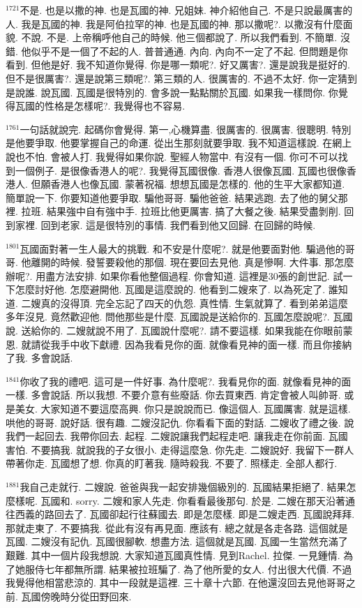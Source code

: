 \documentclass{book}
\begin{document}
$^{1721}$不是.
也是以撒的神.
也是瓦國的神.
兄姐妹.
神介紹他自己.
不是只說最厲害的人.
我是瓦國的神.
我是阿伯拉罕的神.
也是瓦國的神.
那以撒呢?.
以撒沒有什麼面貌.
不說.
不是.
上帝稱呼他自己的時候.
他三個都說了.
所以我們看到.
不簡單.
沒錯.
他似乎不是一個了不起的人.
普普通通.
內向.
內向不一定了不起.
但問題是你看到.
但他是好.
我不知道你覺得.
你是哪一類呢?.
好又厲害?.
還是說我是挺好的.
但不是很厲害?.
還是說第三類呢?.
第三類的人.
很厲害的.
不過不太好.
你一定猜到是說誰.
說瓦國.
瓦國是很特別的.
會多說一點點關於瓦國.
如果我一樣問你.
你覺得瓦國的性格是怎樣呢?.
我覺得也不容易.

$^{1761}$一句話就說完.
起碼你會覺得.
第一,心機算盡.
很厲害的.
很厲害.
很聰明.
特別是他要爭取.
他要掌握自己的命運.
從出生那刻就要爭取.
我不知道這樣說.
在網上說也不怕.
會被人打.
我覺得如果你說.
聖經人物當中.
有沒有一個.
你可不可以找到一個例子.
是很像香港人的呢?.
我覺得瓦國很像.
香港人很像瓦國.
瓦國也很像香港人.
但願香港人也像瓦國.
蒙著祝福.
想想瓦國是怎樣的.
他的生平大家都知道.
簡單說一下.
你要知道他要爭取.
騙他哥哥.
騙他爸爸.
結果逃跑.
去了他的舅父那裡.
拉班.
結果強中自有強中手.
拉班比他更厲害.
搞了大餐之後.
結果受盡剝削.
回到家裡.
回到老家.
這是很特別的事情.
我們看到他又回歸.
在回歸的時候.

$^{1801}$瓦國面對著一生人最大的挑戰.
和不安是什麼呢?.
就是他要面對他.
騙過他的哥哥.
他離開的時候.
發誓要殺他的那個.
現在要回去見他.
真是慘啊.
大件事.
那怎麼辦呢?.
用盡方法安排.
如果你看他整個過程.
你會知道.
這裡是30張的創世記.
試一下怎麼討好他.
怎麼避開他.
瓦國是這麼說的.
他看到二嫂來了.
以為死定了.
誰知道.
二嫂真的沒得頂.
完全忘記了四天的仇怨.
真性情.
生氣就算了.
看到弟弟這麼多年沒見.
竟然歡迎他.
問他那些是什麼.
瓦國說是送給你的.
瓦國怎麼說呢?.
瓦國說.
送給你的.
二嫂就說不用了.
瓦國說什麼呢?.
請不要這樣.
如果我能在你眼前蒙恩.
就請從我手中收下獻禮.
因為我看見你的面.
就像看見神的面一樣.
而且你接納了我.
多會說話.

$^{1841}$你收了我的禮吧.
這可是一件好事.
為什麼呢?.
我看見你的面.
就像看見神的面一樣.
多會說話.
所以我想.
不要介意有些廢話.
你去買東西.
肯定會被人叫帥哥.
或是美女.
大家知道不要這麼高興.
你只是說說而已.
像這個人.
瓦國厲害.
就是這樣.
哄他的哥哥.
說好話.
很有趣.
二嫂沒記仇.
你看看下面的對話.
二嫂收了禮之後.
說我們一起回去.
我帶你回去.
起程.
二嫂說讓我們起程走吧.
讓我走在你前面.
瓦國害怕.
不要搞我.
就說我的子女很小.
走得這麼急.
你先走.
二嫂說好.
我留下一群人帶著你走.
瓦國想了想.
你真的盯著我.
隨時殺我.
不要了.
照樣走.
全部人都行.

$^{1881}$我自己走就行.
二嫂說.
爸爸與我一起安排幾個級別的.
瓦國結果拒絕了.
結果怎麼樣呢.
瓦國和.
sorry.
二嫂和家人先走.
你看看最後那句.
於是.
二嫂在那天沿著通往西義的路回去了.
瓦國卻起行往蘇國去.
即是怎麼樣.
即是二嫂走西.
瓦國說拜拜.
那就走東了.
不要搞我.
從此有沒有再見面.
應該有.
總之就是各走各路.
這個就是瓦國.
二嫂沒有記仇.
瓦國很腳軟.
想盡方法.
這個就是瓦國.
瓦國一生當然充滿了艱難.
其中一個片段我想說.
大家知道瓦國真性情.
見到Rachel.
拉傑.
一見鍾情.
為了她服侍七年都無所謂.
結果被拉班騙了.
為了他所愛的女人.
付出很大代價.
不過我覺得他相當悲涼的.
其中一段就是這裡.
三十章十六節.
在他還沒回去見他哥哥之前.
瓦國傍晚時分從田野回來.
\end{document}
